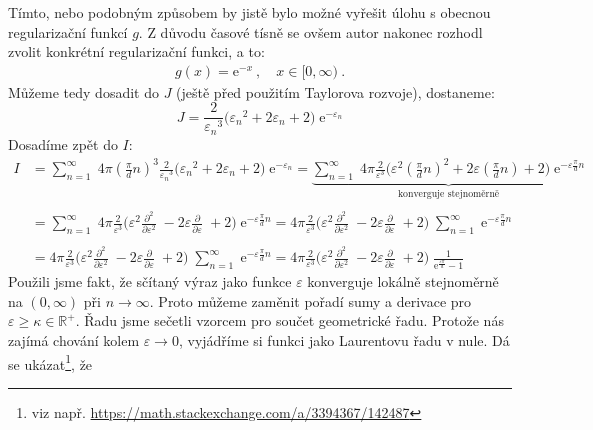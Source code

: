 \documentclass[10pt,a4paper]{article}
\newcommand{\const}[1]{\text{#1}}
\newcommand{\pd}[2]{\frac{\partial  #1}{\partial  #2} \;}
\newcommand{\e}[1]{\const{e}^{#1}}
\def\R{\mathbb{R}}
\begin{document}
Tímto, nebo podobným způsobem by jistě bylo možné vyřešit úlohu s obecnou regularizační funkcí $g$. Z důvodu časové tísně se ovšem autor nakonec rozhodl zvolit konkrétní regularizační funkci, a to:
\begin{gather*}
    g(x) = \e{-x}
    \: , \quad
    x \in [0, \infty)
    \: .
\end{gather*}
Můžeme tedy dosadit do $J$ (ještě před použitím Taylorova rozvoje), dostaneme:
\begin{equation*}
    J =
    \frac{2}{{\varepsilon_n}^3}
    \big( {\varepsilon_n}^2 + 2\varepsilon_n + 2 \big)
    \; \e{-\varepsilon_n}
\end{equation*}
Dosadíme zpět do $I$:
\begin{align*}
    I &=
    \sum_{n=1}^\infty \;
    4\pi
    \left( \tfrac{\pi}{d} n \right)^3
    \frac{2}{{\varepsilon_n}^3}
    \big( {\varepsilon_n}^2 + 2\varepsilon_n + 2 \big)
    \; \e{-\varepsilon_n}
    =
    \underbrace{
        \sum_{n=1}^\infty \;
        4\pi
        \frac{2}{\varepsilon^3}
        \big( {\varepsilon}^2 \left( \tfrac{\pi}{d} n \right)^2 + 2\varepsilon \left( \tfrac{\pi}{d} n \right) + 2 \big)
        \; \e{-\varepsilon \tfrac{\pi}{d} n}
    }_\text{konverguje stejnoměrně}
    \\\\
    &=
    \sum_{n=1}^\infty \;
    4\pi
    \frac{2}{\varepsilon^3}
    \big( {\varepsilon}^2 \pd{^2}{\varepsilon^2}\! - 2\varepsilon \pd{}{\varepsilon}\! + 2 \big)
    \; \e{-\varepsilon \tfrac{\pi}{d} n}
    =
    4\pi
    \frac{2}{\varepsilon^3}
    \big( {\varepsilon}^2 \pd{^2}{\varepsilon^2}\! - 2\varepsilon \pd{}{\varepsilon}\! + 2 \big)
    \; \sum_{n=1}^\infty
    \; \e{-\varepsilon \tfrac{\pi}{d} n}
    \\\\
    &=
    4\pi
    \frac{2}{\varepsilon^3}
    \big( {\varepsilon}^2 \pd{^2}{\varepsilon^2}\! - 2\varepsilon \pd{}{\varepsilon}\! + 2 \big)
    \; \sum_{n=1}^\infty
    \; \e{-\varepsilon \tfrac{\pi}{d} n}
    =
    4\pi
    \frac{2}{\varepsilon^3}
    \big( {\varepsilon}^2 \pd{^2}{\varepsilon^2}\! - 2\varepsilon \pd{}{\varepsilon}\! + 2 \big)
    \; \frac{1}{\e{\frac{\varepsilon \pi}{d}} - 1}
\end{align*}
Použili jsme fakt, že sčítaný výraz jako funkce $\varepsilon$ konverguje lokálně stejnoměrně na $(0, \infty)$ při $n\to\infty$. Proto můžeme zaměnit pořadí sumy a derivace pro $\varepsilon \geq \kappa \in \R^+$. Řadu jsme sečetli vzorcem pro součet geometrické řadu. Protože nás zajímá chování kolem $\varepsilon \to 0$, vyjádříme si funkci jako Laurentovu řadu v nule. Dá se ukázat\footnote{viz např. \url{https://math.stackexchange.com/a/3394367/142487}}, že
\end{document}
